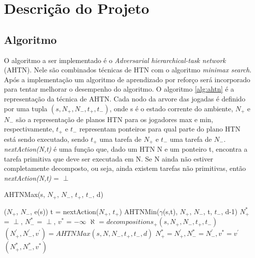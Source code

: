 \chapter{\label{chap:descr}Descrição do Projeto}

\section{Algoritmo}
O algoritmo a ser implementado é o \textit{Adversarial hierarchical-task network} (AHTN). Nele são combinados técnicas de HTN com o algoritmo \textit{minimax search}. Após a implementação um algoritmo de aprendizado por reforço será incorporado para tentar melhorar o desempenho do algoritmo. O algoritmo \ref{alg:ahtn} é a representação da técnica de AHTN. Cada nodo da arvore das jogadas é definido por uma tupla $(s, N_{+}, N_{-}, t_{+}, t_{-})$, onde s é o estado corrente do ambiente, $N_{+}$ e $N_{-}$ são a representação de planos HTN para os jogadores max e min, respectivamente, $t_{+}$ e $t_{-}$ representam ponteiros para qual parte do plano HTN está sendo executado, sendo  $t_{+}$ uma tarefa de $N_{+}$ e $t_{-}$ uma tarefa de $N_{-}$. \textit{nextAction(N,t)} é uma função que, dado um HTN N e um ponteiro t, encontra a tarefa primitiva que deve ser executada em N. Se N ainda não estiver completamente decomposto, ou seja, ainda existem tarefas não primitivas, então \textit{nextAction(N,t)} = $\perp$    %

\begin{algorithm}
	\caption{AHTNMax(s, $N_{+}$, $N_{-}$, $t_{+}$, $t_{-}$, d)}
	\label{alg:ahtn}
	\begin{algorithmic}[1]
		\State	\Return ($N_{+}$, $N_{-}$, e(s))
		\EndIf
		\State t = nextAction($N_{+}$, $t_{+}$) 
		\State \Return AHTNMin($\gamma$(s,t), $N_{+}$, $N_{-}$, t, $t_{-}$, d-1)
		\EndIf
		\State $N_{+}^{*}$ = $\perp$, $N_{-}^{*}$ = $\perp$, $v^{*}$ = $-\infty$
		\State $\aleph$ = $decompositions_{+}(s, N_{+}, N_{-}, t_{+}, t_{-})$
		\State $(N^{'}_{+}, N^{'}_{-}, v^{'}) = AHTNMax(s, N, N_{-}, t_{+}, t_{-}, d)$
		\State $N_{+}^{*} = N^{'}_{+}, N_{-}^{*} = N^{'}_{-}, v^{*} = v^{'} $
		\EndIf
		\EndFor		
		\State \Return $(N_{+}^{*}, N_{-}^{*}, v^{*} )$
	\end{algorithmic}
\end{algorithm}

